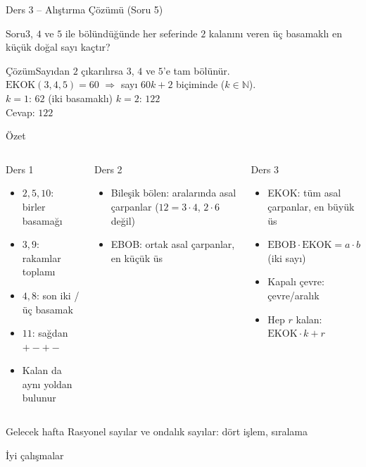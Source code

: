 \documentclass[aspectratio=169,11pt,handout]{beamer}
\newcommand{\soru}[3]{%
\begin{frame}{#1}
  \begin{block}{Soru}\large #2\end{block}
  \pause
  \begin{exampleblock}{Çözüm}\large #3\end{exampleblock}
\end{frame}}
\begin{document}
\soru{Ders 3 -- Alıştırma Çözümü (Soru 5)}
{\(3\), \(4\) ve \(5\) ile bölündüğünde her seferinde \(2\) kalanını veren üç basamaklı en küçük doğal sayı kaçtır?}
{Sayıdan \(2\) çıkarılırsa \(3\), \(4\) ve \(5\)'e tam bölünür.\\[3pt]
\(\text{EKOK}(3,4,5)=60\) \(\Rightarrow\) sayı \(60k+2\) biçiminde (\(k\in\mathbb{N}\)).\\[3pt]
\(k=1\): \(62\) (iki basamaklı) \quad \(k=2\): \(122\)\\[3pt]
Cevap: \(122\)}

\begin{frame}{Özet}
\begin{columns}[t]
\begin{block}{Ders 1}
\small
\begin{itemize}
\item \(2,5,10\): birler basamağı
\item \(3,9\): rakamlar toplamı
\item \(4,8\): son iki / üç basamak
\item \(11\): sağdan \(+-+-\)
\item Kalan da aynı yoldan bulunur
\end{itemize}
\end{block}
\begin{block}{Ders 2}
\small
\begin{itemize}
\item Bileşik bölen: aralarında asal çarpanlar (\(12=3\cdot 4\), \(2\cdot 6\) değil)
\item EBOB: ortak asal çarpanlar, en küçük üs
\end{itemize}
\end{block}
\begin{block}{Ders 3}
\small
\begin{itemize}
\item EKOK: tüm asal çarpanlar, en büyük üs
\item \(\text{EBOB}\cdot\text{EKOK}=a\cdot b\) (iki sayı)
\item Kapalı çevre: çevre/aralık
\item Hep \(r\) kalan: \(\text{EKOK}\cdot k+r\)
\end{itemize}
\end{block}
\end{columns}
\vspace{6pt}
\begin{alertblock}{Gelecek hafta}
Rasyonel sayılar ve ondalık sayılar: dört işlem, sıralama
\end{alertblock}
\end{frame}

\begin{frame}
\centering\Large İyi çalışmalar
\end{frame}
\end{document}
